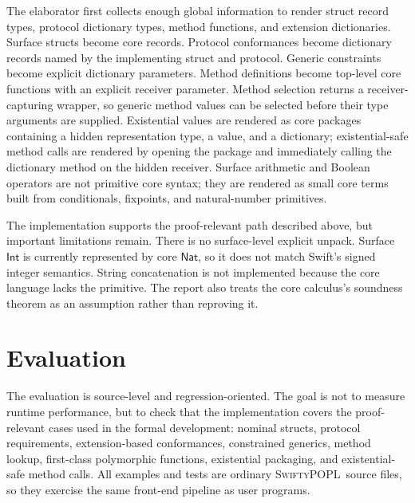 \documentclass[manuscript,nonacm]{acmart}
\newcommand{\lang}{\textsc{SwiftyPOPL}}
\newcommand{\kw}[1]{\ensuremath{\mathsf{#1}}}
\newcommand{\Int}{\kw{Int}}
\newcommand{\Nat}{\kw{Nat}}
\begin{document}
The elaborator first collects enough global information to render struct record types, protocol dictionary types, method functions, and extension dictionaries.
Surface structs become core records.
Protocol conformances become dictionary records named by the implementing struct and protocol.
Generic constraints become explicit dictionary parameters.
Method definitions become top-level core functions with an explicit receiver parameter.
Method selection returns a receiver-capturing wrapper, so generic method values can be selected before their type arguments are supplied.
Existential values are rendered as core packages containing a hidden representation type, a value, and a dictionary; existential-safe method calls are rendered by opening the package and immediately calling the dictionary method on the hidden receiver.
Surface arithmetic and Boolean operators are not primitive core syntax; they are rendered as small core terms built from conditionals, fixpoints, and natural-number primitives.

The implementation supports the proof-relevant path described above, but important limitations remain.
There is no surface-level explicit unpack.
Surface $\Int$ is currently represented by core $\Nat$, so it does not match Swift's signed integer semantics.
String concatenation is not implemented because the core language lacks the primitive.
The report also treats the core calculus's soundness theorem as an assumption rather than reproving it.

\section{Evaluation}

The evaluation is source-level and regression-oriented.
The goal is not to measure runtime performance, but to check that the implementation covers the proof-relevant cases used in the formal development:
nominal structs, protocol requirements, extension-based conformances, constrained generics, method lookup, first-class polymorphic functions, existential packaging, and existential-safe method calls.
All examples and tests are ordinary \lang\ source files, so they exercise the same front-end pipeline as user programs.
\end{document}
